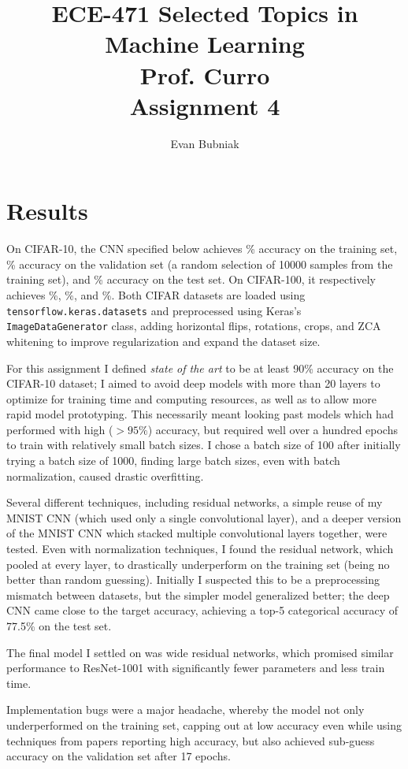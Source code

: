 \documentclass[12pt]{article}
\title{%
   ECE-471 Selected Topics in Machine Learning \\
   Prof. Curro \\
   Assignment 4}
\author{Evan Bubniak}
\begin{document}
\maketitle

\section{Results}

On CIFAR-10, the CNN specified below achieves \% accuracy on the training set, \% accuracy on the validation set (a random selection of 10000 samples from the training set), and \% accuracy on the test set. On CIFAR-100, it respectively achieves \%, \%, and \%. Both CIFAR datasets are loaded using \verb|tensorflow.keras.datasets| and preprocessed using Keras's \verb|ImageDataGenerator| class, adding horizontal flips, rotations, crops, and ZCA whitening to improve regularization and expand the dataset size.

For this assignment I defined \textit{state of the art} to be at least 90\% accuracy on the CIFAR-10 dataset; I aimed to avoid deep models with more than 20 layers to optimize for training time and computing resources, as well as to allow more rapid model prototyping. This necessarily meant looking past models which had performed with high ($>95\%$) accuracy, but required well over a hundred epochs to train with relatively small batch sizes. I chose a batch size of 100 after initially trying a batch size of 1000, finding large batch sizes, even with batch normalization, caused drastic overfitting.

Several different techniques, including residual networks, a simple reuse of my MNIST CNN (which used only a single convolutional layer), and a deeper version of the MNIST CNN which stacked multiple convolutional layers together, were tested. Even with normalization techniques, I found the residual network, which pooled at every layer, to drastically underperform on the training set (being no better than random guessing). Initially I suspected this to be a preprocessing mismatch between datasets, but the simpler model generalized better; the deep CNN came close to the target accuracy, achieving a top-5 categorical accuracy of 77.5\% on the test set.

The final model I settled on was wide residual networks, which promised similar performance to ResNet-1001 with significantly fewer parameters and less train time.

Implementation bugs were a major headache, whereby the model not only underperformed on the training set, capping out at low accuracy even while using techniques from papers reporting high accuracy, but also achieved sub-guess accuracy on the validation set after 17 epochs.
\end{document}
